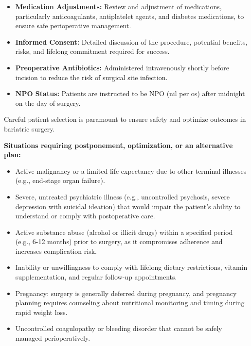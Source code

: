 \begin{itemize}
  \item \textbf{Medication Adjustments:} Review and adjustment of medications, particularly anticoagulants, antiplatelet agents, and diabetes medications, to ensure safe perioperative management.
  \item \textbf{Informed Consent:} Detailed discussion of the procedure, potential benefits, risks, and lifelong commitment required for success.
  \item \textbf{Preoperative Antibiotics:} Administered intravenously shortly before incision to reduce the risk of surgical site infection.
  \item \textbf{NPO Status:} Patients are instructed to be NPO (nil per os) after midnight on the day of surgery.
\end{itemize}

Careful patient selection is paramount to ensure safety and optimize outcomes in bariatric surgery.

\textbf{Situations requiring postponement, optimization, or an alternative plan:}
\begin{itemize}
  \item Active malignancy or a limited life expectancy due to other terminal illnesses (e.g., end-stage organ failure).
  \item Severe, untreated psychiatric illness (e.g., uncontrolled psychosis, severe depression with suicidal ideation) that would impair the patient's ability to understand or comply with postoperative care.
  \item Active substance abuse (alcohol or illicit drugs) within a specified period (e.g., 6-12 months) prior to surgery, as it compromises adherence and increases complication risk.
  \item Inability or unwillingness to comply with lifelong dietary restrictions, vitamin supplementation, and regular follow-up appointments.
  \item Pregnancy: surgery is generally deferred during pregnancy, and pregnancy planning requires counseling about nutritional monitoring and timing during rapid weight loss.
  \item Uncontrolled coagulopathy or bleeding disorder that cannot be safely managed perioperatively.
\end{itemize}

